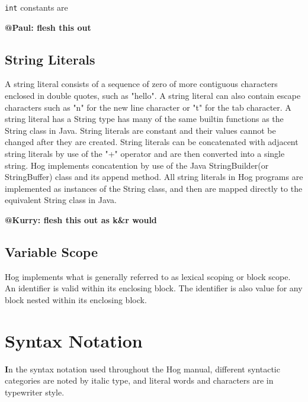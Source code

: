 \documentclass{article}
\begin{document}
{\tt int} constants are 

\textbf{@Paul: flesh this out}


\subsection{String Literals} %
\label{sub:string_literals}
A string literal consists of a sequence of zero of more contiguous characters enclosed
in double quotes, such as "hello". A string literal can also contain escape characters
such as "\/n" for the new line character or "\/t" for the tab character. A string literal
has a String type has many of the same builtin functions as the String class in Java.
String literals are constant and their values cannot be changed after they are created.
String literals can be concatenated with adjacent string literals by use of the "+"
operator and are then converted into a single string. Hog implements concatention
by use of the Java StringBuilder(or StringBuffer) class and its append method. All string
literals in Hog programs are implemented as instances of the String class, and then are
mapped directly to the equivalent String class in Java.

\textbf{@Kurry: flesh this out as k\&r would}


\subsection{Variable Scope} %
\label{sub:variable_scope}

Hog implements what is generally referred to as lexical scoping or block scope. An
identifier is valid within its enclosing block. The identifier is also value for
any block nested within its enclosing block.



\section{Syntax Notation} %
\label{sec:syntax_notation}

\textbf In the syntax notation used throughout the Hog manual, different syntactic categories are noted by italic type, and literal words and characters are in typewriter style. 
\end{document}
